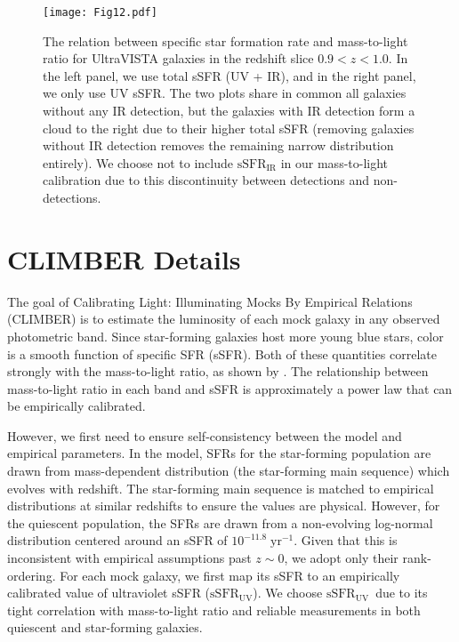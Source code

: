 \documentclass[twocolumn,twocolappendix]{aastex63}
\newcommand{\ssfruv}{$\mathrm{sSFR_{UV}}$}
\begin{document}







\begin{figure*}[ht!]
\centering
\texttt{[image: Fig12.pdf]}
\caption{The relation between specific star formation rate and mass-to-light ratio for UltraVISTA galaxies in the redshift slice $0.9<z<1.0$. In the left panel, we use total sSFR (UV + IR), and in the right panel, we only use UV sSFR. The two plots share in common all galaxies without any IR detection, but the galaxies with IR detection form a cloud to the right due to their higher total sSFR (removing galaxies without IR detection removes the remaining narrow distribution entirely). We choose not to include $\mathrm{sSFR_{IR}}$ in our mass-to-light calibration due to this discontinuity between detections and non-detections.
\label{fig:ssfr-uv-vs-tot}}
\end{figure*}

\appendix
\section{CLIMBER Details}
\label{sec:climber-details}

The goal of Calibrating Light: Illuminating Mocks By Empirical Relations (CLIMBER) is to estimate the luminosity of each mock galaxy in any observed photometric band. Since star-forming galaxies host more young blue stars, color is a smooth function of specific SFR (sSFR). Both of these quantities correlate strongly with the mass-to-light ratio, as shown by \citet{Bell:deJong:2001}. The relationship between mass-to-light ratio in each band and sSFR is approximately a power law that can be empirically calibrated. 

However, we first need to ensure self-consistency between the model and empirical parameters. In the model, SFRs for the star-forming population are drawn from mass-dependent distribution (the star-forming main sequence) which evolves with redshift. The star-forming main sequence is matched to empirical distributions at similar redshifts to ensure the values are physical. However, for the quiescent population, the SFRs are drawn from a non-evolving log-normal distribution centered around an sSFR of $\mathrm{10^{-11.8}\;yr^{-1}}$. Given that this is inconsistent with empirical assumptions past $z\sim0$, we adopt only their rank-ordering.
For each mock galaxy, we first map its sSFR to an empirically calibrated value of ultraviolet sSFR (\ssfruv). We choose \ssfruv\ due to its tight correlation with mass-to-light ratio and reliable measurements in both quiescent and star-forming galaxies.
\end{document}
